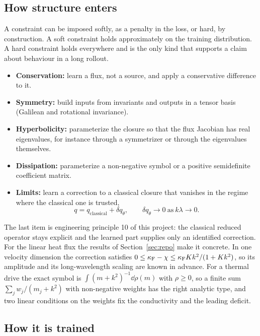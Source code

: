 \subsection{How structure enters}

A constraint can be imposed softly, as a penalty in the loss, or hard, by
construction. A soft constraint holds approximately on the training
distribution. A hard constraint holds everywhere and is the only kind that
supports a claim about behaviour in a long rollout.
\begin{itemize}
  \item \textbf{Conservation:} learn a flux, not a source, and apply a
    conservative difference to it.
  \item \textbf{Symmetry:} build inputs from invariants and outputs in a
    tensor basis (Galilean and rotational invariance).
  \item \textbf{Hyperbolicity:} parameterize the closure so that the flux
    Jacobian has real eigenvalues, for instance through a symmetrizer or
    through the eigenvalues themselves.
  \item \textbf{Dissipation:} parameterize a non-negative symbol or a
    positive semidefinite coefficient matrix.
  \item \textbf{Limits:} learn a correction to a classical closure that
    vanishes in the regime where the classical one is trusted,
    \begin{equation}
      q=q_{\mathrm{classical}}+\delta q_\theta ,
      \qquad \delta q_\theta\to0\ \text{as}\ k\lambda\to0 .
    \end{equation}
\end{itemize}
The last item is engineering principle 10 of this project: the classical
reduced operator stays explicit and the learned part supplies only an
identified correction. For the linear heat flux the results of
Section~\ref{sec:repo} make it concrete. In one velocity dimension the
correction satisfies $0\le\kappa_{\mathrm F}-\chi\le\kappa_{\mathrm F} Kk^2/(1+Kk^2)$, so its amplitude
and its long-wavelength scaling are known in advance. For a thermal drive
the exact symbol is $\int(m+k^2)^{-1}\dd\rho(m)$ with $\rho\ge0$, so a
finite sum $\sum_jw_j/(m_j+k^2)$ with non-negative weights has the right
analytic type, and two linear conditions on the weights fix the
conductivity and the leading deficit.

\subsection{How it is trained}

